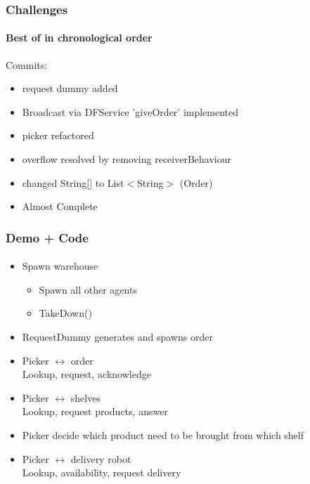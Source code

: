 \documentclass{beamer}
\begin{document}
\begin{frame}[fragile]
\frametitle{Challenges}
\framesubtitle{Best of in chronological order}

Commits:
\begin{itemize}
\item request dummy added
\item Broadcast via DFService 'giveOrder' implemented
\item picker refactored
\item overflow resolved by removing receiverBehaviour
\item changed String[] to List$<$String$>$ (Order)
\item Almost Complete
\end{itemize}

\end{frame}

\begin{frame}[fragile]
\frametitle{Demo + Code}
\framesubtitle{}

\begin{itemize}
\item Spawn warehouse
	\begin{itemize}
	\item Spawn all other agents
	\item TakeDown()
	\end{itemize}
\item RequestDummy generates and spawns order
\item Picker $\leftrightarrow$ order\\
Lookup, request, acknowledge
\item Picker $\leftrightarrow$ shelves\\
Lookup, request products, answer
\item Picker decide which product need to be brought from which shelf
\item Picker $\leftrightarrow$  delivery robot\\
Lookup, availability, request delivery
\end{itemize}


\end{frame}



\end{document}
